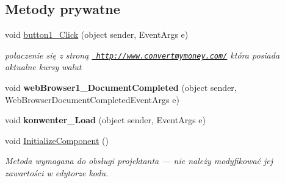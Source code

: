 \subsection*{Metody prywatne}
\begin{DoxyCompactItemize}
\item 
\mbox{\label{classkalku__all__in__one_1_1konwenter_af1b20b82f62814939f71341757bc1929}} 
void \mbox{\hyperlink{classkalku__all__in__one_1_1konwenter_af1b20b82f62814939f71341757bc1929}{button1\+\_\+\+Click}} (object sender, Event\+Args e)
\begin{DoxyCompactList}\small\item\em połaczenie się z stroną \href{http://www.convertmymoney.com/}{\texttt{ http\+://www.\+convertmymoney.\+com/}} która posiada aktualne kursy walut \end{DoxyCompactList}\item 
\mbox{\label{classkalku__all__in__one_1_1konwenter_ab7c719730700e6a3ed81a0ac9cd86a58}} 
void {\bfseries web\+Browser1\+\_\+\+Document\+Completed} (object sender, Web\+Browser\+Document\+Completed\+Event\+Args e)
\item 
\mbox{\label{classkalku__all__in__one_1_1konwenter_ae9dda94ddeab05a8cfed69fec86c7183}} 
void {\bfseries konwenter\+\_\+\+Load} (object sender, Event\+Args e)
\item 
void \mbox{\hyperlink{classkalku__all__in__one_1_1konwenter_a4cac899b93cc3b33e6fddc25f67d4e9f}{Initialize\+Component}} ()
\begin{DoxyCompactList}\small\item\em Metoda wymagana do obsługi projektanta — nie należy modyfikować jej zawartości w edytorze kodu. \end{DoxyCompactList}\end{DoxyCompactItemize}
